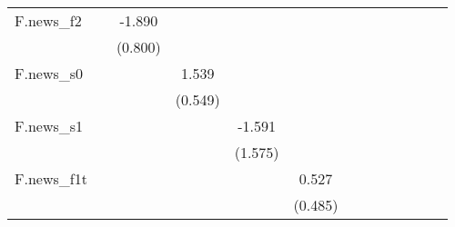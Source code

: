 {\begin{tabular}{l*{12}{c}}
\addlinespace
F.news\_f2   &                     &      -1.890\sym{**} &                     &                     &                     &                     &                     &                     &                     &                     &                     &                     \\
            &                     &     (0.800)         &                     &                     &                     &                     &                     &                     &                     &                     &                     &                     \\
\addlinespace
F.news\_s0   &                     &                     &       1.539\sym{**} &                     &                     &                     &                     &                     &                     &                     &                     &                     \\
            &                     &                     &     (0.549)         &                     &                     &                     &                     &                     &                     &                     &                     &                     \\
\addlinespace
F.news\_s1   &                     &                     &                     &      -1.591         &                     &                     &                     &                     &                     &                     &                     &                     \\
            &                     &                     &                     &     (1.575)         &                     &                     &                     &                     &                     &                     &                     &                     \\
\addlinespace
F.news\_f1t  &                     &                     &                     &                     &       0.527         &                     &                     &                     &                     &                     &                     &                     \\
            &                     &                     &                     &                     &     (0.485)         &                     &                     &                     &                     &                     &                     &                     \\

\end{tabular}}
